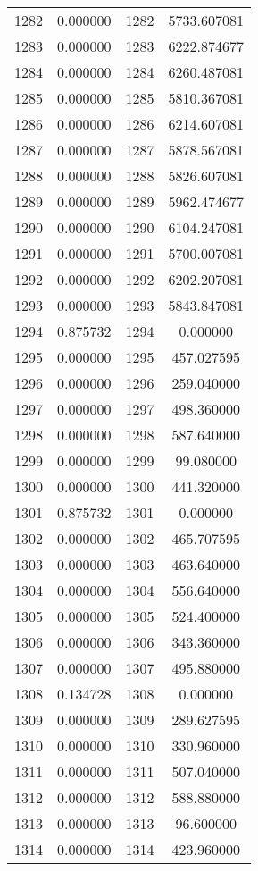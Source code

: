\documentclass[12pt]{article}
\begin{document}
\begin{longtable}{@{}cccc@{}}
1282 & 0.000000 & 1282 & 5733.607081 \\
1283 & 0.000000 & 1283 & 6222.874677 \\
1284 & 0.000000 & 1284 & 6260.487081 \\
1285 & 0.000000 & 1285 & 5810.367081 \\
1286 & 0.000000 & 1286 & 6214.607081 \\
1287 & 0.000000 & 1287 & 5878.567081 \\
1288 & 0.000000 & 1288 & 5826.607081 \\
1289 & 0.000000 & 1289 & 5962.474677 \\
1290 & 0.000000 & 1290 & 6104.247081 \\
1291 & 0.000000 & 1291 & 5700.007081 \\
1292 & 0.000000 & 1292 & 6202.207081 \\
1293 & 0.000000 & 1293 & 5843.847081 \\
1294 & 0.875732 & 1294 & 0.000000 \\
1295 & 0.000000 & 1295 & 457.027595 \\
1296 & 0.000000 & 1296 & 259.040000 \\
1297 & 0.000000 & 1297 & 498.360000 \\
1298 & 0.000000 & 1298 & 587.640000 \\
1299 & 0.000000 & 1299 & 99.080000 \\
1300 & 0.000000 & 1300 & 441.320000 \\
1301 & 0.875732 & 1301 & 0.000000 \\
1302 & 0.000000 & 1302 & 465.707595 \\
1303 & 0.000000 & 1303 & 463.640000 \\
1304 & 0.000000 & 1304 & 556.640000 \\
1305 & 0.000000 & 1305 & 524.400000 \\
1306 & 0.000000 & 1306 & 343.360000 \\
1307 & 0.000000 & 1307 & 495.880000 \\
1308 & 0.134728 & 1308 & 0.000000 \\
1309 & 0.000000 & 1309 & 289.627595 \\
1310 & 0.000000 & 1310 & 330.960000 \\
1311 & 0.000000 & 1311 & 507.040000 \\
1312 & 0.000000 & 1312 & 588.880000 \\
1313 & 0.000000 & 1313 & 96.600000 \\
1314 & 0.000000 & 1314 & 423.960000 \\

\end{longtable}
\end{document}
